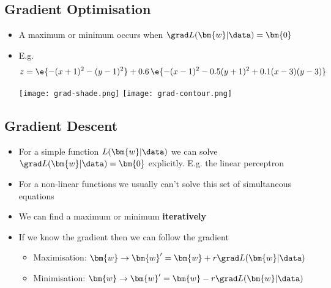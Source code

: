 \Outline %

\begin{slide}
\section[-2]{Gradient Optimisation}

\begin{PauseHighLight}
\hypertarget{descent}{}

\begin{itemize}\squeeze
\item A maximum or minimum occurs when $\grad L(\bm{w}|\data)=\bm{0}$\pause
\item E.g.
\begin{displaymath}
z = \e{-(x+1)^2-(y-1)^2} + 0.6\,\e{-(x-1)^2-0.5(y+1)^2+0.1(x-3)(y-3)}
\end{displaymath}
  \begin{center}
  \texttt{[image: grad-shade.png]}\hfil%
  \texttt{[image: grad-contour.png]}   \pause 
  \end{center}
\end{itemize}
\end{PauseHighLight}
\end{slide}


\begin{slide}
\section{Gradient Descent}

\begin{PauseHighLight}

\begin{itemize}
\item For a simple function $L(\bm{w}|\data)$ we can solve $\grad
  L(\bm{w}|\data)=\bm{0}$ explicitly\pause.  E.g. the linear perceptron\pause
\item For a non-linear functions we usually can't solve this set of
  simultaneous equations\pause
\item We can find a maximum or minimum \textbf{iteratively}\pause
\item If we know the gradient then we can follow the gradient\pause
  \begin{itemize}
  \item Maximisation: $\bm{w} \rightarrow \bm{w}'=\bm{w}+r \grad
    L(\bm{w}|\data)$ \pause
  \item Minimisation: $\bm{w} \rightarrow \bm{w}'=\bm{w}-r \grad
    L(\bm{w}|\data)$ \pause
  \end{itemize}
\end{itemize}


\end{PauseHighLight}
\end{slide}

